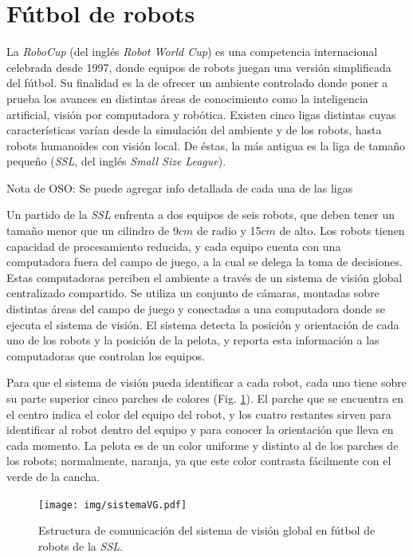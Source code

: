 
\section{Fútbol de robots}

La \emph{RoboCup}\cite{robocupHist} (del inglés \emph{Robot World Cup}) es una
competencia internacional celebrada desde 1997, donde equipos de robots juegan
una versión simplificada del fútbol. Su finalidad es la de ofrecer un ambiente
controlado donde poner a prueba los avances en distintas áreas de conocimiento
como la inteligencia artificial, visión por computadora y robótica. Existen
cinco ligas distintas cuyas características varían desde la simulación del
ambiente y de los robots, hasta robots humanoides con visión local. De éstas, la
más antigua es la liga de tamaño pequeño (\emph{SSL}, del inglés \emph{Small
Size League}).

Nota de OSO: Se puede agregar info detallada de cada una de las ligas

Un partido de la \emph{SSL} enfrenta a dos equipos de seis robots, que deben
tener un tamaño menor que un cilindro de 9$cm$ de radio y 15$cm$ de
alto\cite{sslrules2015}. Los robots tienen capacidad de procesamiento reducida,
y cada equipo cuenta con una computadora fuera del campo de juego, a la cual se
delega la toma de decisiones. Estas computadoras perciben el ambiente a través
de un sistema de visión global centralizado compartido. Se utiliza un conjunto
de cámaras, montadas sobre distintas áreas del campo de juego y conectadas a una
computadora donde se ejecuta el sistema de visión. El sistema detecta la
posición y orientación de cada uno de los robots y la posición de la pelota, y
reporta esta información a las computadoras que controlan los equipos.

Para que el sistema de visión pueda identificar a cada robot, cada uno tiene
sobre su parte superior cinco parches de colores (Fig. \ref{sistemaVG}). El
parche que se encuentra en el centro indica el color del equipo del robot, y los
cuatro restantes sirven para identificar al robot dentro del equipo y para
conocer la orientación que lleva en cada momento. La pelota es de un color
uniforme y distinto al de los parches de los robots; normalmente, naranja, ya
que este color contrasta fácilmente con el verde de la cancha.

\begin{figure}[!h]

	\texttt{[image: img/sistemaVG.pdf]}

	\caption{Estructura de comunicación del sistema de visión global en
	fútbol de robots de la \emph{SSL}.}

	\label{sistemaVG}

\end{figure}

